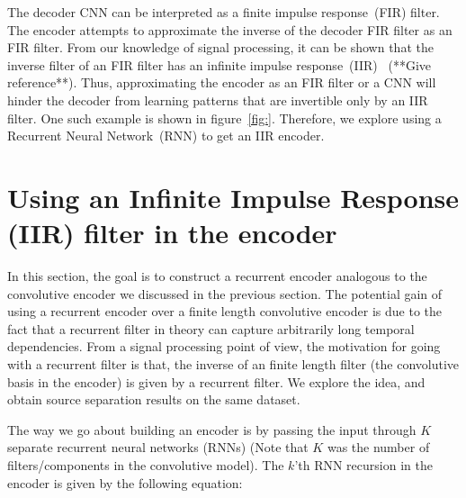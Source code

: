 \documentclass{article}
\begin{document}
The decoder CNN can be interpreted as a finite impulse response~(FIR) filter. The encoder attempts to approximate the inverse of the decoder FIR filter as an FIR filter. From our knowledge of signal processing, it can be shown that the inverse filter of an FIR filter has an infinite impulse response~(IIR)~\cite{} (**Give reference**). Thus, approximating the encoder as an FIR filter or a CNN will hinder the decoder from learning patterns that are invertible only by an IIR filter. One such example is shown in figure~\ref{fig:}. Therefore, we explore using a Recurrent Neural Network~(RNN) to get an IIR encoder.

\section{Using an Infinite Impulse Response (IIR) filter in the encoder}
\label{sec:rnncnn}


In this section, the goal is to construct a recurrent encoder analogous to the convolutive encoder we discussed in the previous section. The potential gain of using a recurrent encoder over a finite length convolutive encoder is due to the fact that a recurrent filter in theory can capture arbitrarily long temporal dependencies. From a signal processing point of view, the motivation for going with a recurrent filter is that, the inverse of an finite length filter (the convolutive basis in the encoder) is given by a recurrent filter. We explore the idea, and obtain source separation results on the same dataset.  

The way we go about building an encoder is by passing the input through $K$ separate recurrent neural networks (RNNs) (Note that $K$ was the number of filters/components in the convolutive model). The $k$'th RNN recursion in the encoder is given by the following equation:    
\end{document}
